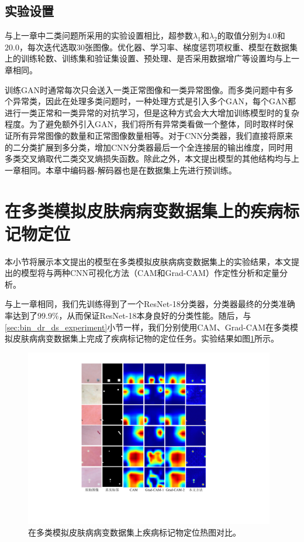 \subsection{实验设置}\label{sec:multi_classes_experiment_setting}
与上一章中二类问题所采用的实验设置相比，超参数$\lambda_{1}$和$\lambda_{2}$的取值分别为$4.0$和$20.0$，每次迭代选取$30$张图像。优化器、学习率、梯度惩罚项权重、模型在数据集上的训练轮数、训练集和验证集设置、预处理、是否采用数据增广等设置均与上一章相同。

训练GAN时通常每次只会送入一类正常图像和一类异常图像。而多类问题中有多个异常类，因此在处理多类问题时，一种处理方式是引入多个GAN，每个GAN都进行一类正常和一类异常的对抗学习，但是这种方式会大大增加训练模型时的复杂程度。为了避免额外引入GAN，我们将所有异常类看做一个整体，同时取样时保证所有异常图像的数量和正常图像数量相等。对于CNN分类器，我们直接将原来的二分类扩展到多分类，增加CNN分类器最后一个全连接层的输出维度，同时用多类交叉熵取代二类交叉熵损失函数。除此之外，本文提出模型的其他结构均与上一章相同。本章中编码器-解码器也是在数据集上先进行预训练。
\section{在多类模拟皮肤病病变数据集上的疾病标记物定位}\label{sec:multi_classes_experiments_res}
本小节将展示本文提出的模型在多类模拟皮肤病病变数据集上的实验结果，本文提出的模型将与两种CNN可视化方法（CAM和Grad-CAM）作定性分析和定量分析。

与上一章相同，我们先训练得到了一个ResNet-18分类器，分类器最终的分类准确率达到了$99.9\%$，从而保证ResNet-18本身良好的分类性能。随后，与\ref{sec:bin_dr_ds_experiment}小节一样，我们分别使用CAM、Grad-CAM在多类模拟皮肤病病变数据集上完成了疾病标记物的定位任务。实验结果如图\ref{fig:multi_simulated_skin_res}所示。
\begin{figure}[h]
	\centering
	\includegraphics[width=0.975\textwidth]{figure/multi_simulated_skin_res.pdf}
	\caption[在多类模拟皮肤病病变数据集上疾病标记物定位热图对比]{在多类模拟皮肤病病变数据集上疾病标记物定位热图对比。}
	\label{fig:multi_simulated_skin_res}
\end{figure}

